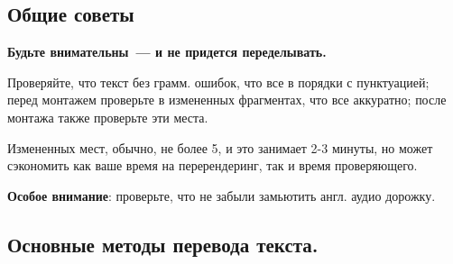 \documentclass[
a4paper, %
12pt, %
article,
onecolumn, %
openany, %
]{memoir}
\begin{document}
\subsection{Общие советы}
\textbf{Будьте внимательны~--- и не придется переделывать.}

Проверяйте, что текст без грамм. ошибок,
что все в порядки с пунктуацией;
перед монтажем проверьте в измененных фрагментах,
что все аккуратно;
после монтажа также проверьте эти места.

Измененных мест, обычно, не более 5, и это занимает 2-3 минуты,
но может сэкономить как ваше время на перерендеринг,
так и время проверяющего.

\textbf{Особое внимание}: проверьте, что не забыли замьютить
англ. аудио дорожку.

\subsection{Основные методы перевода текста.}
\end{document}
